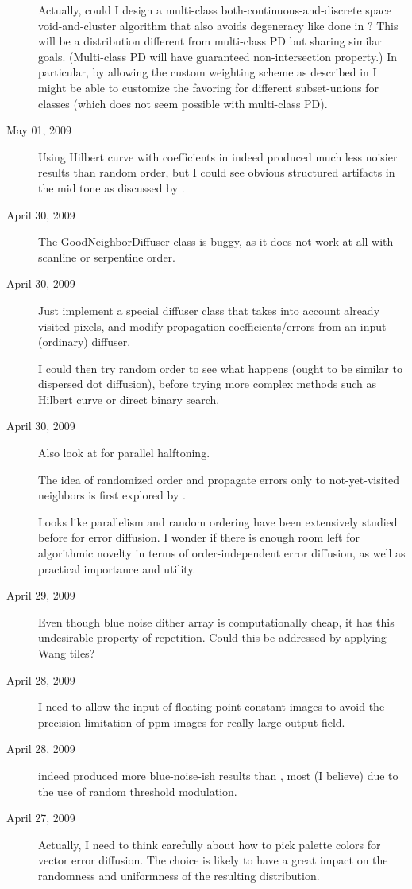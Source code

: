 \begin{description}
{Actually, could I design a multi-class both-continuous-and-discrete space void-and-cluster algorithm that also avoids degeneracy like done in \cite{Balzerand:2009:CCPD}? This will be a distribution different from multi-class PD \cite{Wei:2009:MPDS} but sharing similar goals.
(Multi-class PD will have guaranteed non-intersection property.)
In particular, by allowing the custom weighting scheme as described in \cite{Wang:1999:CBN} I might be able to customize the favoring for different subset-unions for classes (which does not seem possible with multi-class PD).
}
\item[May 01, 2009]
{
Using Hilbert curve with coefficients in \cite{Knuth:1987:DHDD} indeed produced much less noisier results than random order, but I could see obvious structured artifacts in the mid tone as discussed by \cite{Zhou:2003:IMT}.
}
\item[April 30, 2009]
{
The GoodNeighborDiffuser class is buggy, as it does not work at all with scanline or serpentine order.
}
\item[April 30, 2009]
{
Just implement a special diffuser class that takes into account already visited pixels, and modify propagation coefficients/errors from an input (ordinary) diffuser.

I could then try random order to see what happens (ought to be similar to dispersed dot diffusion), before trying more complex methods such as Hilbert curve or direct binary search.
}
\item[April 30, 2009]
{
Also look at \cite{Zhang:1993:SD} for parallel halftoning.

The idea of randomized order and propagate errors only to not-yet-visited neighbors is first explored by \cite{Knuth:1987:DHDD}.

Looks like parallelism and random ordering have been extensively studied before for error diffusion.
I wonder if there is enough room left for algorithmic novelty in terms of order-independent error diffusion, as well as practical importance and utility.
}
\item[April 29, 2009]
{
Even though blue noise dither array is computationally cheap, it has this undesirable property of repetition. Could this be addressed by applying Wang tiles?
}
\item[April 28, 2009]
{
I need to allow the input of floating point constant images to avoid the precision limitation of ppm images for really large output field.
}
\item[April 28, 2009]
{
\cite{Zhou:2003:IMT} indeed produced more blue-noise-ish results than \cite{Ostromoukhov:2001:SEE}, most (I believe) due to the use of random threshold modulation.
}
\item[April 27, 2009]
{
Actually, I need to think carefully about how to pick palette colors for vector error diffusion. The choice is likely to have a great impact on the randomness and uniformness of the resulting distribution.

}
\end{description}
